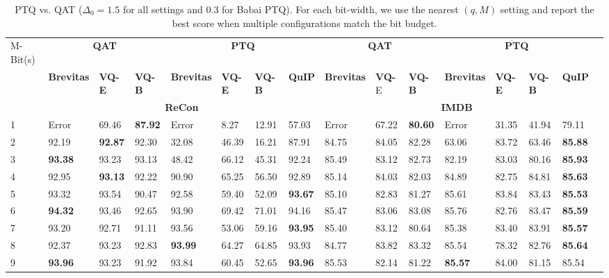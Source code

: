 \documentclass{article}
\theoremstyle{definition}
\theoremstyle{remark}
\begin{document}
\begin{table}[]
    \centering
    \tiny
    \caption{PTQ vs. QAT ($\Delta_0=1.5$ for all settings and 0.3 for Babai PTQ). For each bit-width, we use the nearest $(q,M)$ setting and report the best score when multiple configurations match the bit budget.}
    \label{ptqvsQAT}
    \begin{tabular}{| p{0.5cm}|p{0.6cm}|p{0.7cm}|p{0.7cm}|p{0.6cm}|p{0.6cm}|p{0.6cm}|p{0.6cm}|p{0.6cm}|p{0.7cm}|p{0.7cm}|p{0.6cm}|p{0.6cm}|p{0.6cm}|p{0.6cm}|p{0.6cm}|} \hline
M-Bit(s) & \multicolumn{3}{|c}{\textbf{QAT}} & \multicolumn{4}{|c}{\textbf{PTQ}} & \multicolumn{3}{|c}{\textbf{QAT}} & \multicolumn{4}{|c|}{\textbf{PTQ}} \\ \cline{2-15}
& \textbf{Brevitas} & \textbf{VQ-E} &\textbf{ VQ-B} & \textbf{Brevitas} & \textbf{VQ-E} & \textbf{VQ-B} &\textbf{ QuIP} & \textbf{Brevitas} & \textbf{VQ-}E & \textbf{VQ-B} & \textbf{Brevitas} & \textbf{VQ-E} & \textbf{VQ-B} &\textbf{ QuIP}  \\ \hline
\rowcolor{black!20}
& \multicolumn{7}{c|}{\textbf{ReCon}} &  \multicolumn{7}{|c|}{\textbf{IMDB}}\\ \hline
1    & 	Error &	69.46&	\textbf{87.92}& Error   & 8.27 & 12.91 & 57.03 & Error	& 67.22&	\textbf{80.60}&	Error &	31.35&	41.94&	79.11 \\
2 	& 	92.19&	\textbf{92.87}&	92.30&32.08   &  46.39 & 16.21 & 87.91 & 84.75&	84.05&	82.28&	63.06&	83.72&	63.46&	\textbf{85.88} \\
3 	 & 	\textbf{93.38}&	93.23&	93.13&48.42   & 66.12 & 45.31 & 92.24 & 85.49&	83.12&	82.73&	82.19&	83.03&	80.16&	\textbf{85.93} \\
4 	&	92.95 &	\textbf{93.13}&	92.22&90.90   & 65.25 &  56.50 & 92.89 & 85.14&	84.03&	82.03&	84.89&	82.75&	84.81&	\textbf{85.63} \\
5 	&	93.32&	93.54&	90.47&92.58   & 59.40 & 52.09 & \textbf{93.67} & 85.10&	82.83&	81.27&	85.61&	83.84&	83.43&	\textbf{85.53} \\
6 	&	\textbf{94.32}&	93.46&	92.65&93.90   & 69.42 & 71.01 & 94.16 & 85.47&	83.06&	83.08&	85.76&	82.76&	83.47&	\textbf{85.59} \\
7 	&	93.20&	92.71&	91.11&93.56   & 53.06 & 59.16 & \textbf{93.95} & 85.40&	83.12&	80.64&	85.38&	83.40&	83.91&	\textbf{85.57} \\
8 	&	92.37&	93.23&	92.83&\textbf{93.99}   & 64.27 & 64.85 & 93.93 & 84.77&	83.82&	83.32&	85.54&	78.32&	82.76&	\textbf{85.64} \\
9 	&	\textbf{93.96}&	93.23&	91.92&93.84   & 60.45 & 52.65 & \textbf{93.96} & 85.53&	82.14&	81.22&	\textbf{85.57}&	84.00&	81.15&	85.54 \\

\end{tabular}
\end{table}
\end{document}
